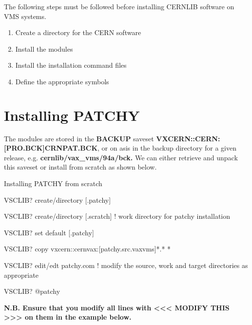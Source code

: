 \label{sect-VMSSETUP}

The following steps must be followed before installing CERNLIB
software on VMS systems.

\begin{enumerate}
\item
Create a directory for the CERN software
\item
Install the \PATCHY{} modules
\item
Install the installation command files
\item
Define the appropriate symbols
\end{enumerate}

\section{Installing PATCHY}

The \PATCHY{} modules are stored in the {\bf BACKUP} saveset 
{\bf VXCERN::CERN:[PRO.BCK]CRNPAT.BCK}, or on asis in 
the backup directory for a given release, e.g. 
{\bf cernlib/vax\_vms/94a/bck.} We can either retrieve
and unpack this saveset or install \PATCHY{} from scratch
as shown below.


\begin{XMPt}{Installing PATCHY from scratch}

VSCLIB? create/directory [.patchy]

VSCLIB? create/directory [.scratch] ! work directory for patchy installation

VSCLIB? set default [.patchy]

VSCLIB? copy vxcern::cernvax:[patchy.src.vaxvms]*.* *

VSCLIB? edit/edt patchy.com  ! modify the source, work and target directories as appropriate

VSCLIB? @patchy

\end{XMPt}

{\bf N.B. Ensure that you modify all lines with <<< MODIFY THIS >>> on
them in the example below.}

